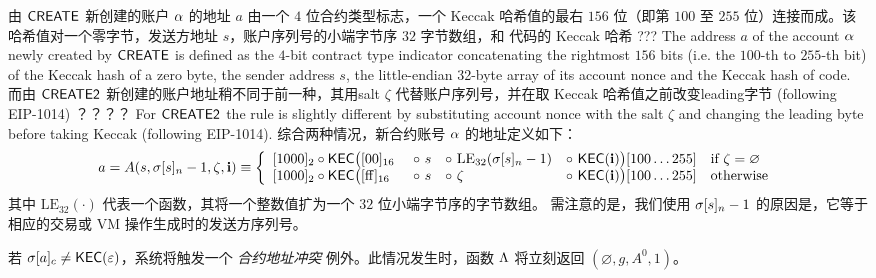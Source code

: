由 {\hyperlink{create}{$\mathsf{CREATE}$}} 新创建的账户 $\mathbf{\alpha}$ 的地址 $a$ 由一个 $4$ 位合约类型标志，一个 Keccak 哈希值的最右 $156$ 位（即第 $100$ 至 $255$ 位）连接而成。该哈希值对一个零字节，发送方地址 $s$，账户序列号的小端字节序 $32$ 字节数组，和 \cvm 代码的 Keccak 哈希
???
The address $a$ of the account $\mathbf{\alpha}$ newly created by {\hyperlink{create}{$\mathsf{CREATE}$}} is defined as the $4$-bit contract type indicator concatenating the rightmost $156$ bits (i.e. the $100$-th to $255$-th bit) of the Keccak hash of a zero byte, the sender address $s$, the little-endian 32-byte array of its account nonce and the Keccak hash of \cvm code. 
% 
而由 {\hyperlink{create2}{$\mathsf{CREATE2}$}} 新创建的账户地址稍不同于前一种，其用salt $\zeta$ 代替账户序列号，并在取 Keccak 哈希值之前改变leading字节 (following EIP-1014)
？？？？
For {\hyperlink{create2}{$\mathsf{CREATE2}$}} the rule is slightly different by substituting account nonce with the salt $\zeta$ and changing the leading byte before taking Keccak (following EIP-1014).
综合两种情况，新合约账号 $\mathbf{\alpha}$ 的地址定义如下：
\begin{align}\label{eq:new-address}
	a= A(s, \st[s]_{n} - 1, \zeta, \vec{i}) \eqdef 
	\left\{\begin{array}{l l l l l}
	 	\typecontract \circ \kec\big([\mathrm{00}]_{16} &~\circ~ s &\circ~ \mathrm{LE}_{32}(\st[s]_n-1) &\circ~ \kec(\vec{i}) \big)[100 \dots 255]
	 	& \text{if}\ \zeta = \varnothing \\
	 	\typecontract \circ \kec\big([\mathrm{ff}]_{16} &~\circ~ s &\circ~  \zeta   &\circ~ \kec(\vec{i}) \big)[100 \dots 255] 
		& \text{otherwise}
	\end{array} \right.
\end{align}
其中 $\mathrm{LE}_{32}(\cdot)$ 代表一个函数，其将一个整数值扩为一个 $32$ 位小端字节序的字节数组。
%
需注意的是，我们使用 $\mathbf{\sigma}[s]_n-1$ 的原因是，它等于相应的交易或 VM 操作生成时的发送方序列号。

若 $\mathbf{\sigma}[a]_c\neq \mathsf{KEC}(\mathbb{\varepsilon})$，系统将触发一个 \emph{合约地址冲突} 例外。此情况发生时，函数 $\mathrm{\Lambda}$ 将立刻返回 $(\varnothing,g,A^0,1)$。

